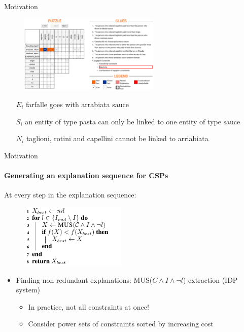 \documentclass[handout]{beamer}
\newcommand\m[1]{\ensuremath{#1}\xspace}
\newcommand\formulac{\ensuremath{\m{C} }\xspace}
\begin{document}
	\begin{frame}{Motivation}
		\begin{figure}
			\includegraphics[width=0.6\textwidth]{logic_puzzles_bij.png}
		\end{figure}\pause
		\begin{itemize}
			\item[$E_i$] farfalle goes with arrabiata sauce \pause
			\item[$S_i$] an entity of type pasta can only be linked to one entity of type sauce\pause
			\item[$N_i$] taglioni, rotini and capellini cannot be linked to arriabiata
		\end{itemize}
		
	\end{frame}
	
	\newcommand\onestep{\ensuremath{\call{explain-One-Step}}\xspace}
	
	
	\begin{frame}{Motivation}
		\framesubtitle{Generating an explanation sequence for CSPs}
		At every step in the explanation sequence:
		\begin{figure}
			\includegraphics[width=0.45\textwidth]{algo_mus2.png}
		\end{figure}
		\begin{itemize}
			\item Finding non-redundant explanations: MUS($\formulac \land I \land \neg l$) extraction (IDP system)
			
			\begin{itemize}
				\item In practice, not all constraints at once!
				\item Consider power sets of constraints sorted by increasing cost
			\end{itemize}
		\end{itemize}
	\end{frame}
	
\end{document}
